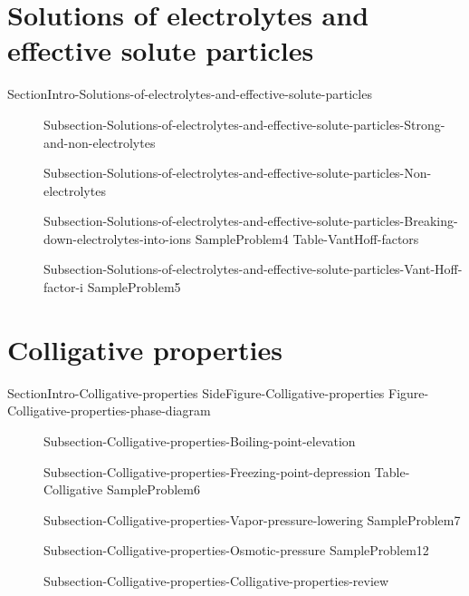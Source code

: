 \documentclass[main.tex]{subfiles}
\newcommand\chapterlabel{Ch-solutions}\setcounter{figurenewcounter}{0}\setcounter{tablenewcounter}{0}\setcounter{formulanewcounter}{0}\chapterpicture{../{\chapterlabel}/figure1}\chapterpicturelabel{PxFuel}
\begin{document}
\section{Solutions of electrolytes and effective solute particles}
{SectionIntro-Solutions-of-electrolytes-and-effective-solute-particles}
\sloppy \begin{description}
\item[] {Subsection-Solutions-of-electrolytes-and-effective-solute-particles-Strong-and-non-electrolytes}
\item[] {Subsection-Solutions-of-electrolytes-and-effective-solute-particles-Non-electrolytes}
\item[] 
{Subsection-Solutions-of-electrolytes-and-effective-solute-particles-Breaking-down-electrolytes-into-ions}
{SampleProblem4}
{Table-VantHoff-factors}
\item[] {Subsection-Solutions-of-electrolytes-and-effective-solute-particles-Vant-Hoff-factor-i}
{SampleProblem5}
\end{description}


\section{Colligative properties}{SectionIntro-Colligative-properties}
{SideFigure-Colligative-properties}
{Figure-Colligative-properties-phase-diagram}
\sloppy \begin{description}
\item[] {Subsection-Colligative-properties-Boiling-point-elevation}
\item[] {Subsection-Colligative-properties-Freezing-point-depression}
{Table-Colligative}
{SampleProblem6}
\item[] {Subsection-Colligative-properties-Vapor-pressure-lowering}
{SampleProblem7}
\vspace{0cm}{Figure-Osmosis}
\item[] {Subsection-Colligative-properties-Osmotic-pressure}
{SampleProblem12}

\item[] {Subsection-Colligative-properties-Colligative-properties-review}
\end{description}
\end{document}
